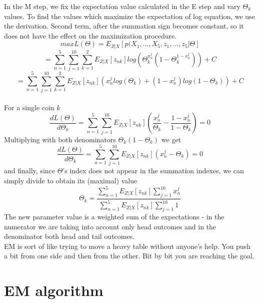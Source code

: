 \documentclass[11pt]{article}
\begin{document}
In the M step, we fix the expectation value calculated in the E step and vary $\Theta_k$ values. To find the values which maximize the expectation of log equation, we use the derivation. Second term, after the summation sign becomes constant, so it does not have the effect on the maximization procedure.
\begin{equation}
maxL(\Theta)=E_{Z|X}[p(X_1,\dots, X_5,{z_1,\dots,z_5}|\Theta]
\end{equation}
\begin{equation}
=\sum_{n=1}^{5}\sum_{j=1}^{10}\sum_{k=1}^{2}E_{Z|X}[z_{nk}]log(\Theta_k^{x_n^j}(1-\Theta_k^{1-x_n^j}))+C
\end{equation}
\begin{equation}
=\sum_{n=1}^{5}\sum_{j=1}^{10}\sum_{k=1}^{2}E_{Z|X}[z_{nk}]({x_n^j}log(\Theta_k)+({1-x_n^j})log(1-\Theta_k))+C
\end{equation}
\\
For a single coin $k$
\begin{equation}
\frac{dL(\Theta)}{d\Theta_k}=\sum_{n=1}^{5}\sum_{j=1}^{10}E_{Z|X}[z_{nk}](\frac{x_n^j}{\Theta_k}-\frac{1-x_n^j}{1-\Theta_k})=0
\end{equation}
Multiplying with both denominators $\Theta_k(1-\Theta_k)$ we get
\begin{equation}
\frac{dL(\Theta)}{d\Theta_k}=\sum_{n=1}^{5}\sum_{j=1}^{10}E_{Z|X}[z_{nk}]({x_n^j}-{\Theta_k})=0
\end{equation}
and finally, since $\Theta$'s index does not appear in the summation indexes, we can simply divide to obtain its (maximal) value
\begin{equation}
\Theta_k=\frac{\sum_{n=1}^{5}E_{Z|X}[z_{nk}]{\sum_{j=1}^{10}x_n^j}}{\sum_{n=1}^{5}E_{Z|X}[z_{nk}]\sum_{j=1}^{10}1}
\end{equation}
The new parameter value is a weighted sum of the expectations - in the numerator we are taking into account only head outcomes and in the denominator both head and tail outcomes.\\
EM is sort of like trying to move a heavy table without anyone's help. You push a bit from one side and then from the other. Bit by bit you are reaching the goal.

\section{EM algorithm}
\end{document}
